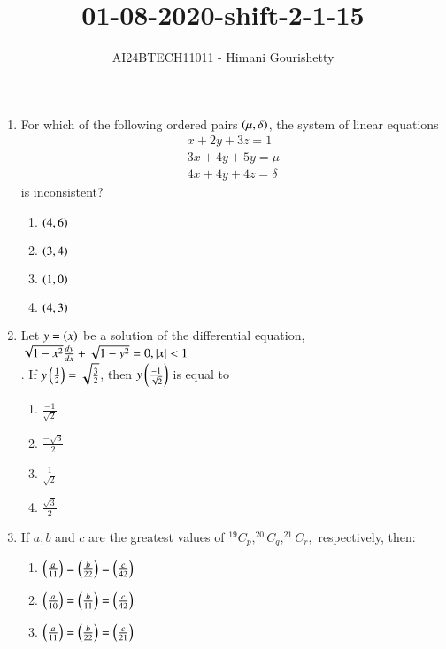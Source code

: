 \documentclass[journal,12pt,onecolumn]{IEEEtran}
\theoremstyle{remark}
\begin{document}

\vspace{3cm}

\title{01-08-2020-shift-2-1-15}
\author{AI24BTECH11011 - Himani Gourishetty}
\maketitle
\bigskip

\renewcommand{\thefigure}{\theenumi}
\renewcommand{\thetable}{\theenumi}
\begin{enumerate}
    \item For which of the following ordered pairs $\left(\mu,\delta\right)$, the system of linear equations
    \begin{align}
    x+ 2y + 3z = 1\nonumber \\
   3x + 4y + 5y = \mu  \nonumber\\
   4x + 4y + 4z = \delta\nonumber
\end{align}
is inconsistent?
\begin{enumerate}
\item $\left(4, 6\right)$
\item $\left(3, 4\right)$
\item $\left(1, 0\right)$
\item $\left(4, 3\right)$
\end{enumerate}
\item Let $y = \left(x\right)$ be a solution of the differential equation, \\
$\sqrt{1-x^2}\frac{dy}{dx}+\sqrt{1-y^2} = 0, \left\vert x\right\vert <1$\\
. If $y\left(\frac{1}{2}\right) = \sqrt{\frac{3}{2}}$, then $y\left(\frac{-1}{\sqrt{2}}\right)$ is equal to
\begin{enumerate}
    \item $\frac{-1}{\sqrt{2}}$
    \item $\frac{-\sqrt3}{2}$
    \item $\frac{1}{\sqrt{2}}$
    \item $\frac{\sqrt{3}}{2}$
\end{enumerate}
 \item If $a, b$ and $c$ are the greatest values of $^{19}C_{p}, ^{20}C_{q}, ^{21}C_{r},$  respectively, then:
 \begin{enumerate}
\item $\left(\frac{a}{11}\right) = \left(\frac{b}{22}\right) = \left(\frac{c}{42}\right)$
\item $\left(\frac{a}{10}\right) = \left(\frac{b}{11}\right) = \left(\frac{c}{42}\right)$
\item $\left(\frac{a}{11}\right) = \left(\frac{b}{22}\right) = \left(\frac{c}{21}\right)$

\end{enumerate}
\end{enumerate}
\end{document}
